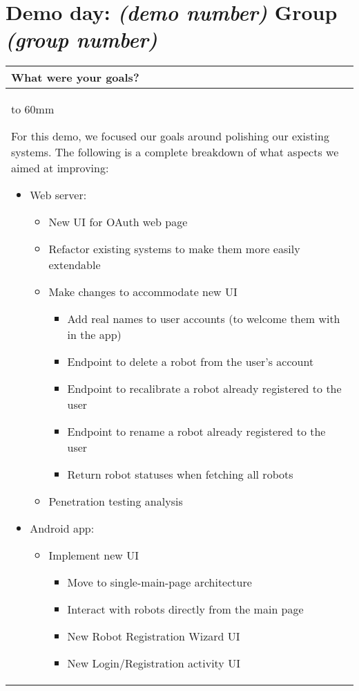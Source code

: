 \documentclass[a4paper]{article}
\newcommand{\colWidth}{141mm}
\begin{document}
 
\section*{Demo day: \textit{(demo number)} Group \textit{(group number)}}


\begin{center}
\begin{tabular}{|p{\colWidth}|}
	\hline
	\cellcolor{blue!25}\large
	\textbf{What were your goals?}
	\\ \hline
	\vtop to 60mm{
	
		For this demo, we focused our goals around polishing our existing systems.
		The following is a complete breakdown of what aspects we aimed at improving:
		\begin{itemize}
			\item Web server:
			\begin{itemize}
				\item New UI for OAuth web page
				\item Refactor existing systems to make them more easily extendable
				\item Make changes to accommodate new UI
				\begin{itemize}
					\item Add real names to user accounts (to welcome them with in the app)
					\item Endpoint to delete a robot from the user's account
					\item Endpoint to recalibrate a robot already registered to the user
					\item Endpoint to rename a robot already registered to the user
					\item Return robot statuses when fetching all robots
				\end{itemize}
				\item Penetration testing analysis
			\end{itemize}
			\item Android app:
			\begin{itemize}
				\item Implement new UI
				\begin{itemize}
					\item Move to single-main-page architecture
					\item Interact with robots directly from the main page
					\item New Robot Registration Wizard UI
					\item New Login/Registration activity UI

\end{itemize}
\end{itemize}
\end{itemize}}
\end{tabular}
\end{center}
\end{document}
